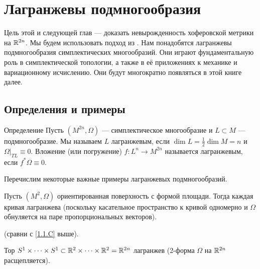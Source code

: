\chapter{Лагранжевы подмногообразия}\label{chap:3}

Цель этой и следующей глав --- доказать невырожденность хоферовской метрики на $\mathbb{R}^{2n}$.
Мы будем использовать подход из \cite{P1}.
Нам понадобятся лагранжевы подмногообразия симплектических многообразий.
Они играют фундаментальную роль в симплектической топологии, а также в её приложениях к механике и вариационному исчислению.
Они будут многократно появляться в этой книге далее.

\section{Определения и примеры}\label{3.1}

\begin{thm*}{Определение}
Пусть $(M^{2n}, \Omega)$ --- симплектическое многообразие и $L \subset M$ --- подмногообразие.
Мы называем $L$ лагранжевым, если $\dim L = \tfrac12 \dim M = n$ и $\Omega|_{TL} \equiv 0$.
Вложение (или погружение) $f\colon L^n \to M^{2n}$ называется лагранжевым, если $f^\ast \Omega \equiv 0$.
\end{thm*}

Перечислим некоторые важные примеры лагранжевых подмногообразий.

\begin{thm}{}\label{3.1.A} 
\end{thm}


Пусть $(M^2, \Omega)$ ориентированная поверхность с формой площади.
Тогда каждая кривая лагранжева (поскольку касательное пространство к кривой одномерно и $\Omega$ обнуляется на паре пропорциональных векторов).

\begin{thm}{}\label{3.1.B} (сравни с \ref{1.1.C} выше).
\end{thm}

Тор $S^1 \times\dots\times S^1
\subset 
\mathbb{R}^2\times\dots\times \mathbb{R}^2 
= 
\mathbb{R}^{2n}$ лагранжев (2-форма $\Omega$ на $\mathbb{R}^{2n}$ расщепляется).


\begin{thm}{}\label{3.1.C}
\end{thm}

